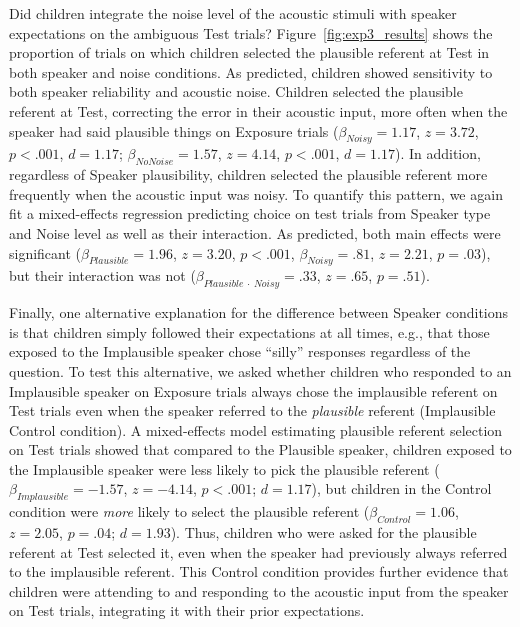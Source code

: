 \documentclass[man,floatsintext]{apa6}
\begin{document}
Did children integrate the noise level of the acoustic stimuli with speaker expectations on the ambiguous Test trials? Figure~\ref{fig:exp3_results} shows the proportion of trials on which children selected the plausible referent at Test in both speaker and noise conditions. As predicted, children showed sensitivity to both speaker reliability and acoustic noise. Children selected the plausible referent at Test, correcting the error in their acoustic input, more often when the speaker had said plausible things on Exposure trials ($\beta_{Noisy} = 1.17$, $z =3.72$, $p < .001$, $d = 1.17$; $\beta_{No Noise} = 1.57$, $z = 4.14$, $p < .001$, $d = 1.17$). In addition, regardless of Speaker plausibility, children selected the plausible referent more frequently when the acoustic input was noisy. To quantify this pattern, we again fit a mixed-effects regression predicting choice on test trials from Speaker type and Noise level as well as their interaction. As predicted, both main effects were significant ($\beta_{Plausible} = 1.96$,  $z = 3.20$, $p <.001$, $\beta_{Noisy} = .81$,  $z = 2.21$, $p = .03$), but their interaction was not ($\beta_{Plausible \: \cdot \: Noisy} = .33$,  $z = .65$, $p = .51$).

Finally, one alternative explanation for the difference between Speaker conditions is that children simply followed their expectations at all times, e.g., that those exposed to the Implausible speaker chose ``silly'' responses regardless of the question. To test this alternative, we asked whether children who responded to an Implausible speaker on Exposure trials always chose the implausible referent on Test trials even when the speaker referred to the \emph{plausible} referent (Implausible Control condition). A mixed-effects model estimating plausible referent selection on Test trials showed that compared to the Plausible speaker, children exposed to the Implausible speaker were less likely to pick the plausible referent ($\beta_{Implausible} = -1.57$,  $z = -4.14$, $p <.001$; $d = 1.17$), but children in the Control condition were \emph{more} likely to select the plausible referent ($\beta_{Control} = 1.06$,  $z = 2.05$, $p = .04$; $d = 1.93$). Thus, children who were asked for the plausible referent at Test selected it, even when the speaker had previously always referred to the implausible referent. This Control condition provides further evidence that children were attending to and responding to the acoustic input from the speaker on Test trials, integrating it with their prior expectations.
\end{document}
